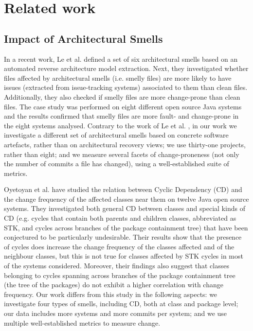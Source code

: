 \section{Related work}\label{c5:sec:related-work}
\subsection{Impact of Architectural Smells}
In a recent work, Le et al. \cite{Le2018} defined a set of six architectural smells based on an automated reverse architecture model extraction. Next, they investigated whether files affected by architectural smells (i.e. smelly files) are more likely to have issues (extracted from issue-tracking systems) associated to them than clean files.
Additionally, they also checked if smelly files are more change-prone than clean files.
The case study was performed on eight different open source Java systems and the results confirmed that smelly files are more fault- and change-prone in the eight systems analysed. 
Contrary to the work of Le et al. \cite{Le2018}, in our work we investigate a different set of architectural smells based on concrete software artefacts, rather than on architectural recovery views; we use thirty-one projects, rather than eight; and we measure several facets of change-proneness (not only the number of commits a file has changed), using a well-established suite of metrics. 

Oyetoyan et al. \cite{Oyetoyan2015} have studied the relation between Cyclic Dependency (CD) and the change frequency of the affected classes near them on twelve Java open source systems.
They investigated both general CD between classes and special kinds of CD (e.g. cycles that contain both parents and children classes, abbreviated as STK, and cycles across branches of the package containment tree) that have been conjectured to be particularly undesirable.
Their results show that the presence of cycles does increase the change frequency of the classes affected and of the neighbour classes, but this is not true for classes affected by STK cycles in most of the systems considered.
Moreover, their findings also suggest that classes belonging to cycles spanning across branches of the package containment tree (the tree of the packages) do not exhibit a higher correlation with change frequency.
Our work differs from this study in the following aspects: we investigate four types of smells, including CD, both at class and package level; our data includes more systems and more commits per system; and we use multiple well-established metrics to measure change.

